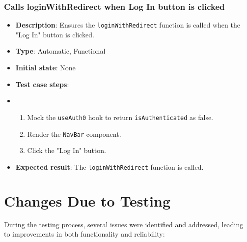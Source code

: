 \documentclass[12pt, titlepage]{article}
\begin{document}
\subsubsection{Calls loginWithRedirect when Log In button is clicked}
\begin{itemize}
    \item \textbf{Description}: Ensures the \texttt{loginWithRedirect} function is called when the "Log In" button is clicked.
    \item \textbf{Type}: Automatic, Functional
    \item \textbf{Initial state}: None
    \item \textbf{Test case steps}:
    \item \begin{enumerate}
        \item Mock the \texttt{useAuth0} hook to return \texttt{isAuthenticated} as false.
        \item Render the \texttt{NavBar} component.
        \item Click the "Log In" button.
    \end{enumerate}
    \item \textbf{Expected result}: The \texttt{loginWithRedirect} function is called.
\end{itemize}

\section{Changes Due to Testing}

During the testing process, several issues were identified and addressed, leading to improvements in both functionality and reliability:
\end{document}
